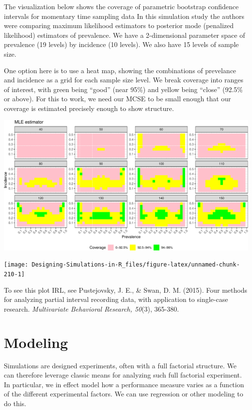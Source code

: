 \documentclass[
]{book}
\begin{document}
The visualization below shows the coverage of parametric bootstrap confidence intervals for momentary time sampling data
In this simulation study the authors were comparing maximum likelihood estimators to posterior mode (penalized likelihood) estimators of prevalence.
We have a 2-dimensional parameter space of prevalence (19 levels) by incidence (10 levels).
We also have 15 levels of sample size.

One option here is to use a heat map, showing the combinations of prevelance and incidence as a grid for each sample size level.
We break coverage into ranges of interest, with green being ``good'' (near 95\%) and yellow being ``close'' (92.5\% or above).
For this to work, we need our MCSE to be small enough that our coverage is estimated precisely enough to show structure.

\begin{center}\includegraphics[width=0.75\linewidth]{Designing-Simulations-in-R_files/figure-latex/swan_example_setup-1} \end{center}

\begin{center}\texttt{[image: Designing-Simulations-in-R\_files/figure-latex/unnamed-chunk-210-1]} \end{center}

To see this plot IRL, see Pustejovsky, J. E., \& Swan, D. M. (2015). Four methods for analyzing partial interval recording data, with application to single-case research. \emph{Multivariate Behavioral Research, 50}(3), 365-380.

\hypertarget{modeling}{%
\section{Modeling}\label{modeling}}

Simulations are designed experiments, often with a full factorial structure.
We can therefore leverage classic means for analyzing such full factorial experiment.
In particular, we in effect model how a performance measure varies as a function of the different experimental factors.
We can use regression or other modeling to do this.
\end{document}

